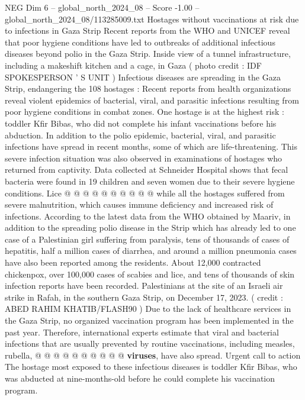 \begin{textsample}{NEG Dim 6 – global\_north\_2024\_08 – Score -1.00 – global\_north\_2024\_08/113285009.txt}  \label{ex:f6_neg_157}
Hostages without vaccinations at risk due to infections in Gaza Strip Recent reports from the WHO and UNICEF reveal that poor hygiene conditions have led to outbreaks of additional infectious diseases beyond polio in the Gaza Strip.
Inside view of a tunnel infrastructure, including a makeshift kitchen and a cage, in Gaza ( photo credit : IDF SPOKESPERSON ' S UNIT ) Infectious diseases are spreading in the Gaza Strip, endangering the 108 hostages : Recent reports from health organizations reveal violent epidemics of bacterial, viral, and parasitic infections resulting from poor hygiene conditions in combat zones.
One hostage is at the highest risk : toddler Kfir Bibas, who did not complete his infant vaccinations before his abduction.
In addition to the polio epidemic, bacterial, viral, and parasitic infections have spread in recent months, some of which are life-threatening.
This severe infection situation was also observed in examinations of hostages who returned from captivity.
Data collected at Schneider Hospital shows that fecal bacteria were found in 19 children and seven women due to their severe hygiene conditions.
Lice @ @ @ @ @ @ @ @ @ @ while all the hostages suffered from severe malnutrition, which causes immune deficiency and increased risk of infections.
According to the latest data from the WHO obtained by Maariv, in addition to the spreading polio disease in the Strip which has already led to one case of a Palestinian girl suffering from paralysis, tens of thousands of cases of hepatitis, half a million cases of diarrhea, and around a million pneumonia cases have also been reported among the residents.
About 12,000 contracted chickenpox, over 100,000 cases of scabies and lice, and tens of thousands of skin infection reports have been recorded.
Palestinians at the site of an Israeli air strike in Rafah, in the southern Gaza Strip, on December 17, 2023. ( credit : ABED RAHIM KHATIB/FLASH90 ) Due to the lack of healthcare services in the Gaza Strip, no organized vaccination program has been implemented in the past year.
Therefore, international experts estimate that viral and bacterial infections that are usually prevented by routine vaccinations, including measles, rubella, @ @ @ @ @ @ @ @ @ @ \textbf{viruses}, have also spread.
Urgent call to action The hostage most exposed to these infectious diseases is toddler Kfir Bibas, who was abducted at nine-months-old before he could complete his vaccination program.

\end{textsample}
